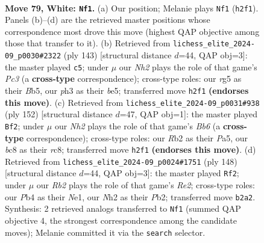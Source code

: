 \documentclass[11pt]{article}
\begin{document}
\clearpage

\begin{figure}[p]\centering
\begin{subfigure}{0.46\textwidth}\centering
\resizebox{\linewidth}{!}{%
\newchessgame
\chessboard[
  setfen={1Bb2k2/8/8/6r1/PP2B3/2K4p/1R5N/8 w - - 15 79},
  showmover=false,
  pgfstyle=straightmove, color=movearrow, markmove={h2-f1}
]}
\caption{}
\end{subfigure}\hfill
\begin{subfigure}{0.46\textwidth}\centering
\resizebox{\linewidth}{!}{%
\newchessgame
\chessboard[
  setfen={8/4K2k/2p3r1/Pb2B3/8/8/8/3R4 b - - 9 72},
  showmover=false,
  pgfstyle=straightmove, color=movearrow, markmove={c6-c5}
]}
\caption{}
\end{subfigure}
\\[4pt]
\begin{subfigure}{0.46\textwidth}\centering
\resizebox{\linewidth}{!}{%
\newchessgame
\chessboard[
  setfen={2r5/5R2/pB1b2P1/P5K1/4k3/8/8/8 w - - 7 77},
  showmover=false,
  pgfstyle=straightmove, color=movearrow, markmove={b6-f2}
]}
\caption{}
\end{subfigure}\hfill
\begin{subfigure}{0.46\textwidth}\centering
\resizebox{\linewidth}{!}{%
\newchessgame
\chessboard[
  setfen={8/8/5k2/8/3p1P2/1p5q/1P2R3/3KN3 w - - 12 75},
  showmover=false,
  pgfstyle=straightmove, color=movearrow, markmove={e2-f2}
]}
\caption{}
\end{subfigure}
\caption{\textbf{Move 79, White: \texttt{Nf1}.} (a) Our position; Melanie plays \texttt{Nf1} (\texttt{h2f1}). Panels (b)--(d) are the retrieved master positions whose correspondence most drove this move (highest QAP objective among those that transfer to it). (b) Retrieved from \texttt{lichess\_elite\_2024-09\_p0030\#2322} (ply 143) [structural distance $d$=44, QAP obj=3]: the master played \texttt{c5}; under $\mu$ our \emph{Nh2} plays the role of that game's \emph{Pc3} (a \textbf{cross-type} correspondence); cross-type roles: our \emph{r}g5 as their \emph{B}b5, our \emph{p}h3 as their \emph{b}e5; transferred move \texttt{h2f1} \textbf{(endorses this move)}. (c) Retrieved from \texttt{lichess\_elite\_2024-09\_p0031\#938} (ply 152) [structural distance $d$=47, QAP obj=1]: the master played \texttt{Bf2}; under $\mu$ our \emph{Nh2} plays the role of that game's \emph{Bb6} (a \textbf{cross-type} correspondence); cross-type roles: our \emph{R}b2 as their \emph{P}a5, our \emph{b}c8 as their \emph{r}c8; transferred move \texttt{h2f1} \textbf{(endorses this move)}. (d) Retrieved from \texttt{lichess\_elite\_2024-09\_p0024\#1751} (ply 148) [structural distance $d$=44, QAP obj=3]: the master played \texttt{Rf2}; under $\mu$ our \emph{Rb2} plays the role of that game's \emph{Re2}; cross-type roles: our \emph{P}b4 as their \emph{N}e1, our \emph{N}h2 as their \emph{P}b2; transferred move \texttt{b2a2}. Synthesis: 2 retrieved analogs transferred to \texttt{Nf1} (summed QAP objective 4, the strongest correspondence among the candidate moves); Melanie committed it via the \texttt{search} selector.}
\label{fig:thought-m156}
\end{figure}
\end{document}
